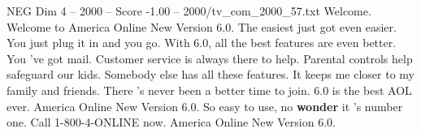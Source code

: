 \begin{textsample}{NEG Dim 4 – 2000 – Score -1.00 – 2000/tv\_com\_2000\_57.txt}  \label{ex:f4_neg_025}
Welcome.
Welcome to America Online New Version 6.0.
The easiest just got even easier.
You just plug it in and you go.
With 6.0, all the best features are even better.
You 've got mail.
Customer service is always there to help.
Parental controls help safeguard our kids.
Somebody else has all these features.
It keeps me closer to my family and friends.
There 's never been a better time to join. 6.0 is the best AOL ever.
America Online New Version 6.0.
So easy to use, no \textbf{wonder} it 's number one.
Call 1-800-4-ONLINE now.
America Online New Version 6.0.

\end{textsample}
